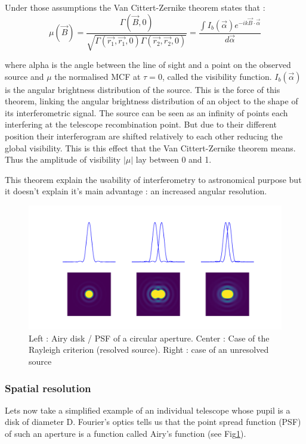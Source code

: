 Under those assumptions the Van Cittert-Zernike theorem states that :
$$
\mu(\vec{B}) = \frac{\Gamma(\vec{B},0)}{\sqrt{\Gamma(\vec{r_1},\vec{r_1},0)\Gamma(\vec{r_2},\vec{r_2},0)}} = \frac{\int I_b(\vec{\alpha}) e^{-ik\vec{B} \cdot \vec{\alpha}}}{d\vec{\alpha}}
$$

where alpha is the angle between the line of sight and a point on the observed source and $\mu$ the normalised MCF at $\tau=0$, called the visibility function. $I_b(\vec{\alpha})$ is the angular brightness distribution of the source. This is the force of this theorem, linking the angular brightness distribution of an object to the shape of its interferometric signal. The source can be seen as an infinity of points each interfering at the telescope recombination point. But due to their different position their interferogram are shifted relatively to each other reducing the global visibility. This is this effect that the Van Cittert-Zernike theorem means. Thus the amplitude of visibility $\left| \mu \right|$ lay between 0 and 1.

This theorem explain the usability of interferometry to astronomical purpose but it doesn't explain it's main advantage : an increased angular resolution. 

\begin{figure}[htbp!]
\centering
\includegraphics[scale=.3]{../picture/airy.pdf}
\caption{Left : Airy disk / PSF of a circular aperture. Center : Case of the Rayleigh criterion (resolved source). Right : case of an unresolved source}
\label{fig:airy}
\end{figure}

	\subsubsection{Spatial resolution}
Lets now take a simplified example of an individual telescope whose pupil is a disk of diameter D. Fourier's optics tells us that the point spread function (PSF) of such an aperture is a function called Airy's function (see Fig\ref{fig:airy}). 

